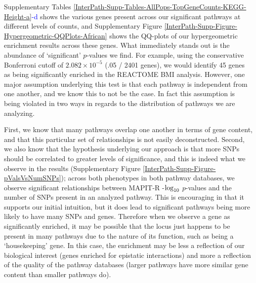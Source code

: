 \documentclass[12pt,a4paper]{article}
\def\log{{\rm log}}
\begin{document}
Supplementary Tables \ref{InterPath-Supp-Tables-AllPops-TopGeneCounts-KEGG-Height-a}\textcolor{blue}{-d} shows the various genes present across our significant pathways at different levels of counts, and Supplementary Figure \ref{InterPath-Supp-Figure-Hypergeometric-QQPlots-African} shows the QQ-plots of our hypergeometric enrichment results across these genes. What immediately stands out is the abundance of `significant' $p$-values we find. For example, using the conservative Bonferroni cutoff of $2.082\times10^{-5}$ (.05 / 2401 genes), we would identify 45 genes as being significantly enriched in the REACTOME BMI analysis. However, one major assumption underlying this test is that each pathway is independent from one another, and we know this to not be the case. In fact this assumption is being violated in two ways in regards to the distribution of pathways we are analyzing. 

First, we know that many pathways overlap one another in terms of gene content, and that this particular set of relationships is not easily deconstructed. Second, we also know that the hypothesis underlying our approach is that more SNPs should be correlated to greater levels of significance, and this is indeed what we observe in the results (Supplementary Figure \ref{InterPath-Supp-Figure-pValsVsNumSNPs}); across both phenotypes in both pathway databases, we observe significant relationships between MAPIT-R -$\log_{10}$ $p$-values and the number of SNPs present in an analyzed pathway. This is encouraging in that it supports our initial intuition, but it does lead to significant pathways being more likely to have many SNPs and genes. Therefore when we observe a gene as significantly enriched, it may be possible that the locus just happens to be present in many pathways due to the nature of its function, such as being a `housekeeping' gene. In this case, the enrichment may be less a reflection of our biological interest (genes enriched for epistatic interactions) and more a reflection of the quality of the pathway databases (larger pathways have more similar gene content than smaller pathways do).
\end{document}

